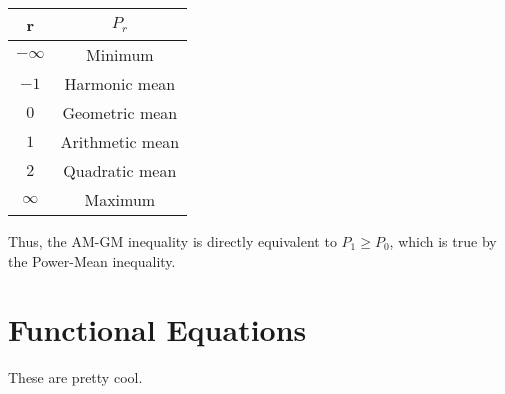 \documentclass[a4paper,12pt]{article}
\begin{document}
\begin{table}[]
    \centering
\begin{tabular}{|c|c|}
\hline
r                         & $P_r$            \\
\hline
$-\infty$                 & Minimum         \\
\hline
$-1$                      & Harmonic mean   \\
\hline
$0$                       & Geometric mean  \\
\hline
$1$                       & Arithmetic mean \\
\hline
$2$                       & Quadratic mean  \\
\hline
$\infty$                  & Maximum \\
\hline       
\end{tabular}
\end{table}

Thus, the AM-GM inequality is directly equivalent to $P_1 \geq P_0$, which is true by the Power-Mean inequality.

\section{Functional Equations}
These are pretty cool.
\end{document}

